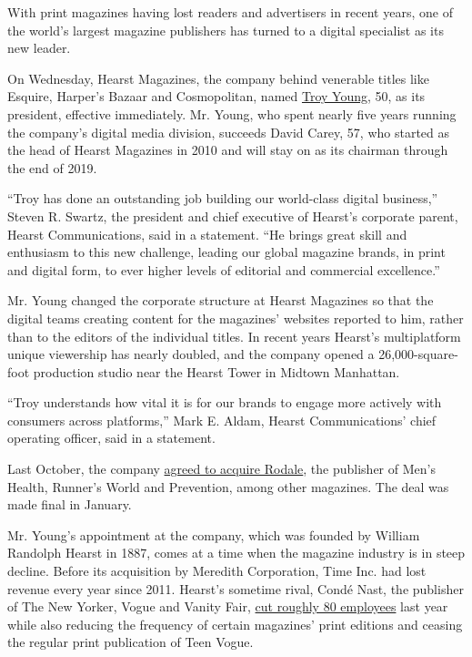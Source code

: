 With print magazines having lost readers and advertisers in recent
years, one of the world's largest magazine publishers has turned to a
digital specialist as its new leader.

On Wednesday, Hearst Magazines, the company behind venerable titles like
Esquire, Harper's Bazaar and Cosmopolitan, named
\href{https://www.nytimes3xbfgragh.onion/2020/07/22/business/media/hearst-harassment-troy-young.html}{Troy
Young}, 50, as its president, effective immediately. Mr. Young, who
spent nearly five years running the company's digital media division,
succeeds David Carey, 57, who started as the head of Hearst Magazines in
2010 and will stay on as its chairman through the end of 2019.

``Troy has done an outstanding job building our world-class digital
business,'' Steven R. Swartz, the president and chief executive of
Hearst's corporate parent, Hearst Communications, said in a statement.
``He brings great skill and enthusiasm to this new challenge, leading
our global magazine brands, in print and digital form, to ever higher
levels of editorial and commercial excellence.''

Mr. Young changed the corporate structure at Hearst Magazines so that
the digital teams creating content for the magazines' websites reported
to him, rather than to the editors of the individual titles. In recent
years Hearst's multiplatform unique viewership has nearly doubled, and
the company opened a 26,000-square-foot production studio near the
Hearst Tower in Midtown Manhattan.

``Troy understands how vital it is for our brands to engage more
actively with consumers across platforms,'' Mark E. Aldam, Hearst
Communications' chief operating officer, said in a statement.

Last October, the company
\href{https://www.nytimes3xbfgragh.onion/2017/10/18/business/media/hearst-rodale-magazines.html}{agreed
to acquire Rodale}, the publisher of Men's Health, Runner's World and
Prevention, among other magazines. The deal was made final in January.

Mr. Young's appointment at the company, which was founded by William
Randolph Hearst in 1887, comes at a time when the magazine industry is
in steep decline. Before its acquisition by Meredith Corporation, Time
Inc. had lost revenue every year since 2011. Hearst's sometime rival,
Condé Nast, the publisher of The New Yorker, Vogue and Vanity Fair,
\href{https://www.nytimes3xbfgragh.onion/2017/11/02/business/media/conde-nast-teen-vogue.html}{cut
roughly 80 employees} last year while also reducing the frequency of
certain magazines' print editions and ceasing the regular print
publication of Teen Vogue.

